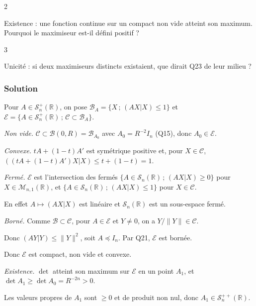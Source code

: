 \documentclass[11pt,a4paper]{article}
\begin{document}
\begin{indication}{2}

Existence : une fonction continue sur un compact non vide atteint son maximum. Pourquoi le maximiseur est-il défini positif ?

\end{indication}

\begin{indication}{3}

Unicité : si deux maximiseurs distincts existaient, que dirait Q23 de leur milieu ?

\end{indication}

\hypertarget{solution-27}{%
\subsubsection{Solution}\label{solution-27}}

Pour \(A\in{\mathcal{S}}_n^+(\mathbb{R})\), on pose \({\mathcal{B}}_A=\{X\,;\,(AX|X)\leqslant1\}\) et \(\mathcal{E}=\{A\in{\mathcal{S}}_n^+(\mathbb{R})\,;\,\mathcal{C}\subset{\mathcal{B}}_A\}\).

\emph{Non vide.} \(\mathcal{C}\subset\mathcal{B}(0,R)={\mathcal{B}}_{A_0}\) avec \(A_0=R^{-2}I_n\) (Q15), donc \(A_0\in\mathcal{E}\).

\emph{Convexe.} \(tA+(1-t)A'\) est symétrique positive et, pour \(X\in\mathcal{C}\), \(((tA+(1-t)A')X|X)\leqslant t+(1-t)=1\).

\emph{Fermé.} \(\mathcal{E}\) est l'intersection des fermés \(\{A\in{\mathcal{S}}_n(\mathbb{R})\,;\,(AX|X)\geqslant0\}\) pour \(X\in{\mathcal{M}}_{n,1}(\mathbb{R})\), et \(\{A\in{\mathcal{S}}_n(\mathbb{R})\,;\,(AX|X)\leqslant1\}\) pour \(X\in\mathcal{C}\).

En effet \(A\mapsto(AX|X)\) est linéaire et \({\mathcal{S}}_n(\mathbb{R})\) est un sous-espace fermé.

\emph{Borné.} Comme \(\mathcal{B}\subset\mathcal{C}\), pour \(A\in\mathcal{E}\) et \(Y\neq0\), on a \(Y/\|Y\|\in\mathcal{C}\).

Donc \((AY|Y)\leqslant\|Y\|^2\), soit \(A\preccurlyeq I_n\). Par Q21, \(\mathcal{E}\) est bornée.

Donc \(\mathcal{E}\) est compact, non vide et convexe.

\emph{Existence.} \(\det\) atteint son maximum sur \(\mathcal{E}\) en un point \(A_1\), et \(\det A_1\geqslant\det A_0=R^{-2n}>0\).

Les valeurs propres de \(A_1\) sont \(\geqslant0\) et de produit non nul, donc \(A_1\in{\mathcal{S}}_n^{++}(\mathbb{R})\).
\end{document}
